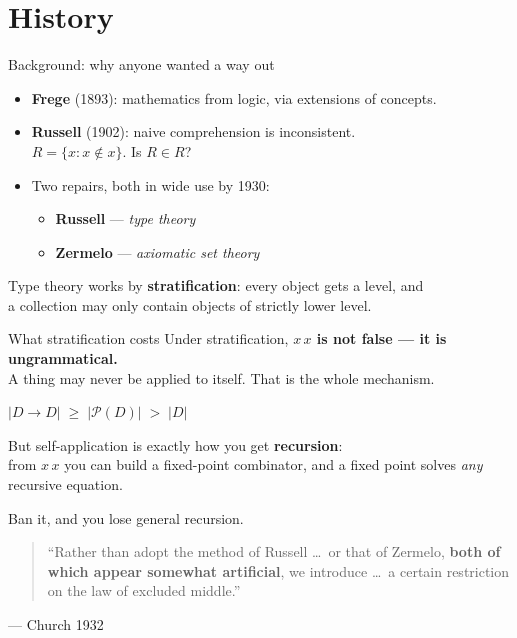 \documentclass[aspectratio=169,11pt]{beamer}
\newcommand{\key}[1]{{\color{accent}\textbf{#1}}}
\begin{document}
\section{History}

\begin{frame}{Background: why anyone wanted a way out}
  \begin{itemize}\itemsep1.1em
    \item \textbf{Frege} (1893): mathematics from logic, via extensions of concepts.
    \item \textbf{Russell} (1902): naive comprehension is inconsistent.\\
          {\small $R = \{x : x \notin x\}$. Is $R \in R$?}
    \item Two repairs, both in wide use by 1930:
      \begin{itemize}\itemsep0.4em
        \item \key{Russell} --- \emph{type theory}
        \item \key{Zermelo} --- \emph{axiomatic set theory}
      \end{itemize}
  \end{itemize}
  \vfill
  \pause
  \begin{center}
    Type theory works by \key{stratification}: every object gets a level,
    and\\ a collection may only contain objects of strictly lower level.
  \end{center}
\end{frame}

\begin{frame}{What stratification costs}
  \vfill
  Under stratification, \key{$x\,x$ is not false --- it is ungrammatical.}\\
  {\small A thing may never be applied to itself. That is the whole mechanism.}
  \vfill
  \begin{center}\large
    $|D \to D| \;\geq\; |\mathcal{P}(D)| \;>\; |D|$
  \end{center}
  \vfill
  \pause
  But self-application is exactly how you get \key{recursion}:\\
  {\small from $x\,x$ you can build a fixed-point combinator, and a fixed point
   solves \emph{any} recursive equation.}
  \vfill
  \pause
  \begin{center}\large
    Ban it, and you lose general recursion.
  \end{center}
  \vfill
  \pause
  \begin{quote}\small
    ``Rather than adopt the method of Russell \dots\ or that of Zermelo,
    \textbf{both of which appear somewhat artificial}, we introduce \dots\
    a certain restriction on the law of excluded middle.''
  \end{quote}
  \hfill{\footnotesize --- Church 1932}
\end{frame}
\end{document}
